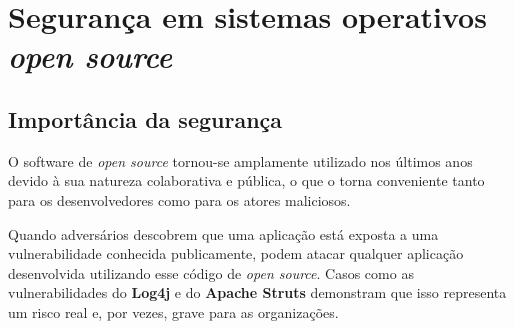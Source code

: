 \section{Segurança em sistemas operativos \textit{open source}} \label{section: segurança}
\subsection{Importância da segurança}
O software de \textit{open source} tornou-se amplamente utilizado nos últimos anos devido à sua natureza colaborativa e pública, o que o torna conveniente tanto para os desenvolvedores como para os atores maliciosos.
\par \vspace{6pt}
Quando adversários descobrem que uma aplicação está exposta a uma vulnerabilidade conhecida publicamente, podem atacar qualquer aplicação desenvolvida utilizando esse código de \textit{open source}. Casos como as vulnerabilidades do \textbf{Log4j} e do \textbf{Apache Struts} demonstram que isso representa um risco real e, por vezes, grave para as organizações. \cite{openSourceSecurity}
